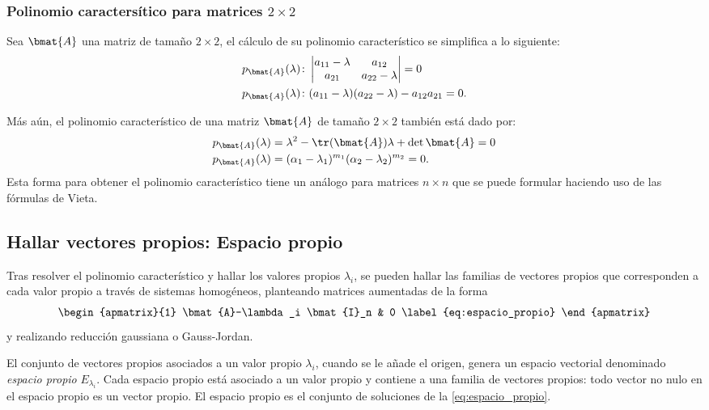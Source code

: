 \documentclass{fmbnotes}
\begin{document}
\subsubsection{Polinomio caractersítico para matrices \(2 \times 2\)}

Sea \(\bmat{A}\) una matriz de tamaño \(2\times 2\), el cálculo de su polinomio característico se simplifica a lo siguiente:
\begin{align*}
	p_{\bmat{A}}(\lambda)\colon& \begin{vmatrix}
	a_{11}-\lambda & a_{12} \\
	a_{21} & a_{22}-\lambda
	\end{vmatrix}=0 \\
	p_{\bmat{A}}(\lambda)\colon&(a_{11}-\lambda)(a_{22}-\lambda)-a_{12} a_{21}=0. 
\end{align*} 

Más aún, el polinomio característico de una matriz \(\bmat{A}\) de tamaño \(2\times2\) también está dado por:
\begin{align*}
	p_{\bmat{A}}(\lambda) & = \lambda^2 - \tr(\bmat{A})\lambda +\det\bmat{A}=0 \\
	p_{\bmat{A}}(\lambda) & = (\alpha_1-\lambda_1)^{m_1}(\alpha_2-\lambda_2)^{m_2}=0.
\end{align*}
Esta forma para obtener el polinomio característico tiene un análogo para matrices \(n\times n \) que se puede formular haciendo uso de las fórmulas de Vieta. 


\subsection{Hallar vectores propios: Espacio propio}

Tras resolver el polinomio característico y hallar los valores propios \(\lambda_i\), se pueden hallar las familias de vectores propios que corresponden a cada valor propio a través de sistemas homogéneos, planteando matrices aumentadas de la forma
\begin{equation}
	\begin{apmatrix}{1}
			\bmat{A}-\lambda_i \bmat{I}_n & 0
			\label{eq:espacio_propio}
	\end{apmatrix}
\end{equation}
y realizando reducción gaussiana o Gauss-Jordan.

El conjunto de vectores propios asociados a un valor propio \(\lambda_i\), cuando se le añade el origen, genera un espacio vectorial denominado \emph{espacio propio} \(E_{\lambda_i}\). Cada espacio propio está asociado a un valor propio y contiene a una familia de vectores propios: todo vector no nulo en el espacio propio es un vector propio. El espacio propio es el conjunto de soluciones de la \autoref{eq:espacio_propio}.
\end{document}
